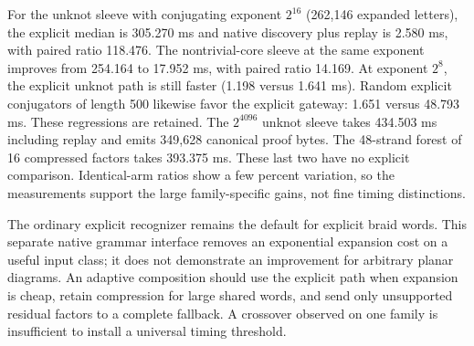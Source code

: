 For the unknot sleeve with conjugating exponent $2^{16}$ (262,146 expanded
letters), the explicit median is 305.270 ms and native discovery plus replay
is 2.580 ms, with paired ratio 118.476. The nontrivial-core sleeve at the same
exponent improves from 254.164 to 17.952 ms, with paired ratio 14.169.
At exponent $2^8$, the explicit unknot path is still faster (1.198 versus
1.641 ms). Random explicit conjugators of length 500 likewise favor the
explicit gateway: 1.651 versus 48.793 ms. These regressions are retained.
The $2^{4096}$ unknot sleeve takes 434.503 ms including replay and emits
349,628 canonical proof bytes. The 48-strand forest of 16 compressed factors
takes 393.375 ms. These last two have no explicit comparison. Identical-arm
ratios show a few percent variation, so the measurements support the large
family-specific gains, not fine timing distinctions.

The ordinary explicit recognizer remains the default for explicit braid words.
This separate native grammar interface removes an exponential expansion cost
on a useful input class; it does not demonstrate an improvement for arbitrary
planar diagrams. An adaptive composition should use the explicit path when
expansion is cheap, retain compression for large shared words, and send only
unsupported residual factors to a complete fallback. A crossover observed on
one family is insufficient to install a universal timing threshold.

